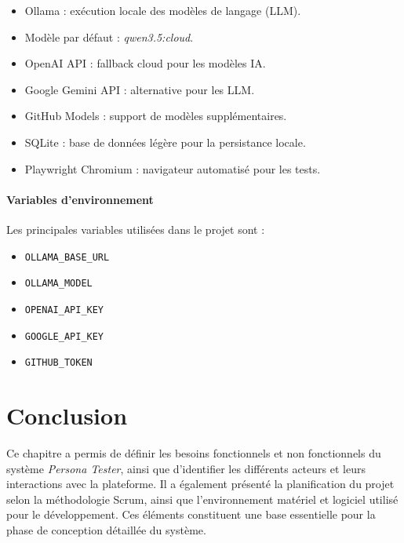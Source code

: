 \begin{itemize}
    \item Ollama : exécution locale des modèles de langage (LLM).
    \item Modèle par défaut : \textit{qwen3.5:cloud}.
    \item OpenAI API : fallback cloud pour les modèles IA.
    \item Google Gemini API : alternative pour les LLM.
    \item GitHub Models : support de modèles supplémentaires.
    \item SQLite : base de données légère pour la persistance locale.
    \item Playwright Chromium : navigateur automatisé pour les tests.
\end{itemize}

\paragraph{Variables d’environnement}

Les principales variables utilisées dans le projet sont :
\begin{itemize}
    \item \texttt{OLLAMA\_BASE\_URL}
    \item \texttt{OLLAMA\_MODEL}
    \item \texttt{OPENAI\_API\_KEY}
    \item \texttt{GOOGLE\_API\_KEY}
    \item \texttt{GITHUB\_TOKEN}
\end{itemize}

\section{Conclusion}

Ce chapitre a permis de définir les besoins fonctionnels et non fonctionnels du système \textit{Persona Tester}, ainsi que d’identifier les différents acteurs et leurs interactions avec la plateforme. Il a également présenté la planification du projet selon la méthodologie Scrum, ainsi que l’environnement matériel et logiciel utilisé pour le développement. Ces éléments constituent une base essentielle pour la phase de conception détaillée du système.